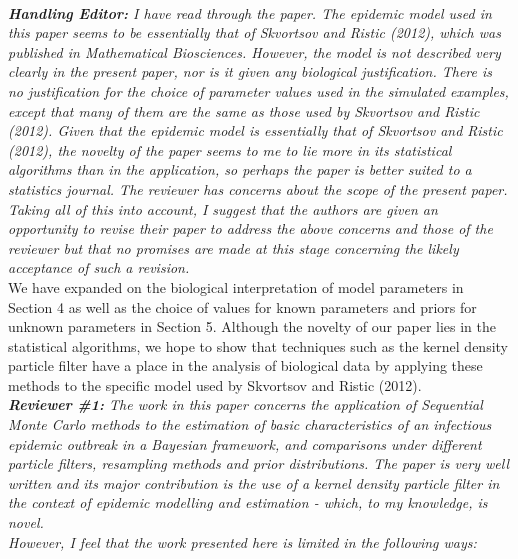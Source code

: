 \documentclass{article}
\begin{document}
 \\

\noindent \emph{{\bf Handling Editor:}  I have read through the paper.  The epidemic model used in this paper seems to be essentially that of Skvortsov and Ristic (2012), which was published in Mathematical Biosciences.  However, the model is not described very clearly in the present paper, nor is it given any biological justification.  There is no justification for the choice of parameter values used in the simulated examples, except that many of them are the same as those used by Skvortsov and Ristic (2012).  Given that the epidemic model is essentially that of Skvortsov and Ristic (2012), the novelty of the paper seems to me to lie more in its statistical algorithms than in the application, so perhaps the paper is better suited to a statistics journal.  The reviewer has concerns about the scope of the present paper.  Taking all of this into account, I suggest that the authors are given an opportunity to revise their paper to address the above concerns and those of the reviewer but that no promises are made at this stage concerning the likely acceptance of such a revision.} \\

We have expanded on the biological interpretation of model parameters in Section 4 as well as the choice of values for known parameters and priors for unknown parameters in Section 5. Although the novelty of our paper lies in the statistical algorithms, we hope to show that techniques such as the kernel density particle filter have a place in the analysis of biological data by applying these methods to the specific model used by Skvortsov and Ristic (2012). \\

\noindent \emph{{\bf Reviewer \#1:} The work in this paper concerns the application of Sequential Monte Carlo methods to the estimation of basic characteristics of an infectious epidemic outbreak in a Bayesian framework, and comparisons under different particle filters, resampling methods and prior distributions. The paper is very well written and its major contribution is the use of a kernel density particle filter in the context of epidemic modelling and estimation - which, to my knowledge, is novel.} \\

\noindent \emph{However, I feel that the work presented here is limited in the following ways:} \\
\end{document}
